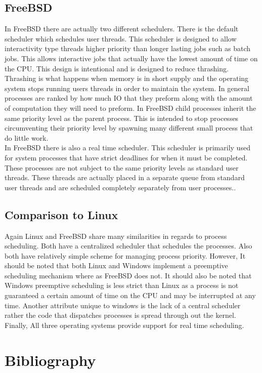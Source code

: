 \documentclass[letterpaper, onecolumn,10pt]{IEEEtran}
\begin{document}
			\subsection{FreeBSD}
				In FreeBSD there are actually two different schedulers. There is the default scheduler which schedules user threads. This scheduler is designed to allow interactivity type threads higher priority than longer lasting jobs such as batch jobs. This allows interactive jobs that actually have the lowest amount of time on the CPU. This design is intentional and is designed to reduce thrashing. Thrashing is what happens when memory is in short supply and the operating system stops running users threads in order to maintain the system. In general processes are ranked by how much IO that they preform along with the amount of computation they will need to preform. In FreeBSD child processes inherit the same priority level as the parent process. This is intended to stop processes circumventing their priority level by spawning many different small process that do little work\cite{FreeBSD}.\\
				In FreeBSD there is also a real time scheduler. This scheduler is primarily used for system processes that have strict deadlines for when it must be completed. These processes are not subject to the same priority levels as standard user threads. These threads are actually placed in a separate queue from standard user threads and are scheduled completely separately from user processes.\cite{FreeBSD}.\\
					
			\subsection{Comparison to Linux}
				Again Linux and FreeBSD share many similarities in regards to process scheduling. Both have a centralized scheduler that schedules the processes. Also both have relatively simple scheme for managing process priority. However, It should be noted that both Linux and Windows implement a preemptive scheduling mechanism where as FreeBSD does not. It should also be noted that Windows preemptive scheduling is less strict than Linux as a process is not guaranteed a certain amount of time on the CPU and may be interrupted at any time. Another attribute unique to windows is the lack of a central scheduler rather the code that dispatches processes is spread through out the kernel. Finally, All three operating systems provide support for real time scheduling\cite{FreeBSD}\cite{Linux}\cite{Winodws}.\\
				
		\newpage	
		\section{Bibliography}
		
		
\end{document}
